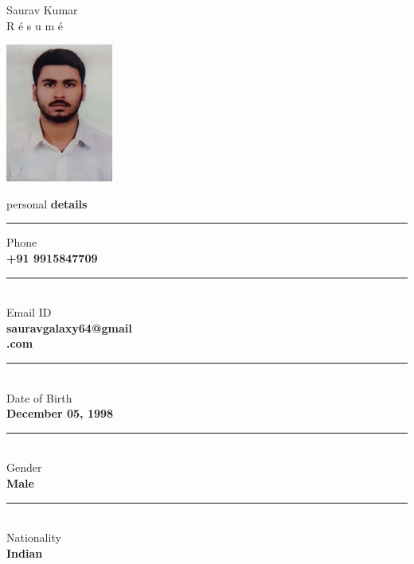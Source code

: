 \documentclass[11pt]{article}
\begin{document}
\begin{center}
\fontsize{30pt}{18pt}
\selectfont Saurav 
\selectfont Kumar\\
\fontsize{16pt}{28pt}\selectfont R \'{e} s u m \'{e}
\end{center}
\vspace{1cm}

\begin{vwcol}[widths={0.235,0.6}, sep=1.3cm, justify=flush, rule=0.1pt, indent=0em] 
\includegraphics[scale=0.012]{saurav.jpg}
\vspace{0.3cm}

\fontsize{15.5pt}{18pt}\selectfont
\mdseries personal \bfseries details
\rule{3.9cm}{0.1pt}

\fontsize{11.5pt}{14pt}\selectfont
{}\selectfont Phone\\ 
\bfseries\selectfont +91 9915847709\vspace{1mm}

\rule{3.9cm}{0.1pt}\\ 
\selectfont Email ID\\ 
\bfseries\selectfont sauravgalaxy64@gmail\\
.com\\

\rule{3.9cm}{0.1pt}\\
\selectfont Date of Birth\\ 
\bfseries\selectfont December 05, 1998\vspace{1mm}

\rule{3.9cm}{0.1pt}\\
\selectfont Gender\\ 
\bfseries\selectfont Male\vspace{1mm}

\rule{3.9cm}{0.1pt}\\
\selectfont Nationality\\ 
\bfseries\selectfont Indian\vspace{1mm}


\end{vwcol}
\end{document}
